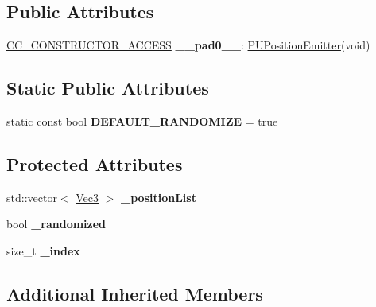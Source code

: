 \subsection*{Public Attributes}
\begin{DoxyCompactItemize}
\item 
\mbox{\label{classPUPositionEmitter_a7f970240cf03b6c93b3f482240ea2cb7}} 
\hyperlink{_2cocos2d_2cocos_2base_2ccConfig_8h_a25ef1314f97c35a2ed3d029b0ead6da0}{C\+C\+\_\+\+C\+O\+N\+S\+T\+R\+U\+C\+T\+O\+R\+\_\+\+A\+C\+C\+E\+SS} {\bfseries \+\_\+\+\_\+pad0\+\_\+\+\_\+}\+: \hyperlink{classPUPositionEmitter}{P\+U\+Position\+Emitter}(void)
\end{DoxyCompactItemize}
\subsection*{Static Public Attributes}
\begin{DoxyCompactItemize}
\item 
\mbox{\label{classPUPositionEmitter_af9dfee3afe962afc873dbd48b0a2a469}} 
static const bool {\bfseries D\+E\+F\+A\+U\+L\+T\+\_\+\+R\+A\+N\+D\+O\+M\+I\+ZE} = true
\end{DoxyCompactItemize}
\subsection*{Protected Attributes}
\begin{DoxyCompactItemize}
\item 
\mbox{\label{classPUPositionEmitter_a3b18cd05cd271020facab48fb5524992}} 
std\+::vector$<$ \hyperlink{classVec3}{Vec3} $>$ {\bfseries \+\_\+position\+List}
\item 
\mbox{\label{classPUPositionEmitter_a06c3879208f11df87bce00b99c8a66c7}} 
bool {\bfseries \+\_\+randomized}
\item 
\mbox{\label{classPUPositionEmitter_a4fdc77fa6248df2d6a26f3c47acabfd1}} 
size\+\_\+t {\bfseries \+\_\+index}
\end{DoxyCompactItemize}
\subsection*{Additional Inherited Members}


